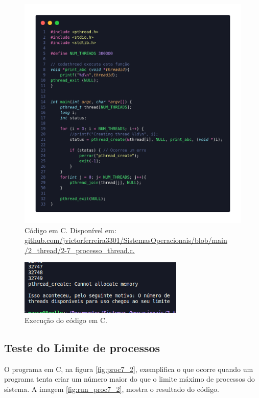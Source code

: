 \documentclass[
	12pt,				%
	openright,			%
	oneside,			%
	a4paper,			%
	chapter=TITLE,		%
	english,			%
	french,				%
	spanish,			%
	brazil				%
	]{abntex2}
\theoremstyle{definition}
\begin{document}
\begin{figure}
    \centering
    \includegraphics[width=0.8 \textwidth]{imagens/processos_7.png}
    \caption{Código em C. Disponível em: \href{https://github.com/jvictorferreira3301/Sistemas_Operacionais/blob/main/2_thread/2-7_processo_thread.c}{github.com/jvictorferreira3301/SistemasOperacionais/blob/main
    /2\_thread/2-7\_processo\_thread.c.}}
    \label{fig:proc7}
\end{figure}

\begin{figure}
    \centering
    \includegraphics[width=0.7\textwidth]{imagens/run_processos_7.png}
    \caption{Execução do código em C.}
    \label{fig:run7_2}
\end{figure}

\subsection{Teste do Limite de processos}
O programa em C, na figura \ref{fig:proc7_2}, exemplifica o que ocorre quando um programa tenta criar um número maior do que o limite máximo de processos do sistema. A imagem  \ref{fig:run_proc7_2}, mostra o resultado do código.
\end{document}
